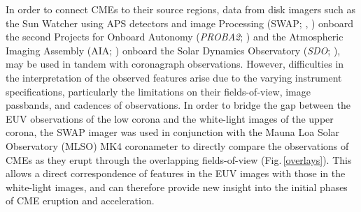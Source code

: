 \documentclass[namedreferences]{solarphysics}
\begin{document}
\begin{article}
In order to connect CMEs to their source regions, data from disk imagers such as the Sun Watcher using APS detectors and image Processing (SWAP; , ) onboard the second Projects for Onboard Autonomy (\emph{PROBA2}; ) and the Atmospheric Imaging Assembly (AIA; ) onboard the Solar Dynamics Observatory (\emph{SDO}; ), may be used in tandem with coronagraph observations. However, difficulties in the interpretation of the observed features arise due to the varying instrument specifications, particularly the limitations on their fields-of-view, image passbands, and cadences of observations. In order to bridge the gap between the EUV observations of the low corona and the white-light images of the upper corona, the SWAP imager was used in conjunction with the Mauna Loa Solar Observatory (MLSO) MK4 coronameter \cite{2003SPIE.4843...66E} to directly compare the observations of CMEs as they erupt through the overlapping fields-of-view (Fig.\,\ref{overlays}). This allows a direct correspondence of features in the EUV images with those in the white-light images, and can therefore provide new insight into the initial phases of CME eruption and acceleration.


\end{article}
\end{document}
